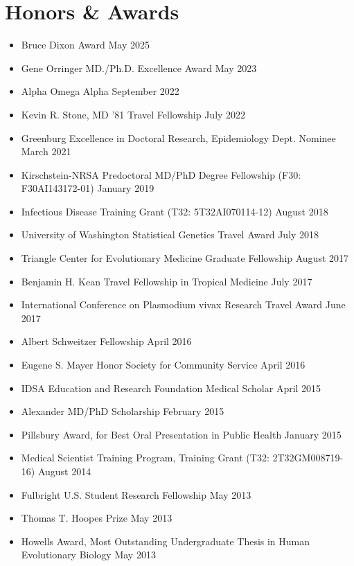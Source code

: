 \documentclass[11pt,letterpaper]{article}
\begin{document}
\vspace{18pt}

\section{Honors \& Awards}

\begin{itemize}[leftmargin=*, itemsep=2pt, parsep=0pt]
\item Bruce Dixon Award \hfill May 2025
\item Gene Orringer MD./Ph.D. Excellence Award \hfill May 2023
\item Alpha Omega Alpha \hfill September 2022
\item Kevin R. Stone, MD '81 Travel Fellowship \hfill July 2022
\item Greenburg Excellence in Doctoral Research, Epidemiology Dept. Nominee \hfill March 2021
\item Kirschstein-NRSA Predoctoral MD/PhD Degree Fellowship (F30: F30AI143172-01) \hfill January 2019
\item Infectious Disease Training Grant (T32: 5T32AI070114-12) \hfill August 2018
\item University of Washington Statistical Genetics Travel Award \hfill July 2018
\item Triangle Center for Evolutionary Medicine Graduate Fellowship \hfill August 2017
\item Benjamin H. Kean Travel Fellowship in Tropical Medicine \hfill July 2017
\item International Conference on Plasmodium vivax Research Travel Award \hfill June 2017
\item Albert Schweitzer Fellowship \hfill April 2016
\item Eugene S. Mayer Honor Society for Community Service \hfill April 2016
\item IDSA Education and Research Foundation Medical Scholar \hfill April 2015
\item Alexander MD/PhD Scholarship \hfill February 2015
\item Pillsbury Award, for Best Oral Presentation in Public Health \hfill January 2015
\item Medical Scientist Training Program, Training Grant (T32: 2T32GM008719-16) \hfill August 2014
\item Fulbright U.S. Student Research Fellowship \hfill May 2013
\item Thomas T. Hoopes Prize \hfill May 2013
\item Howells Award, Most Outstanding Undergraduate Thesis in Human Evolutionary Biology \hfill May 2013

\end{itemize}
\end{document}
